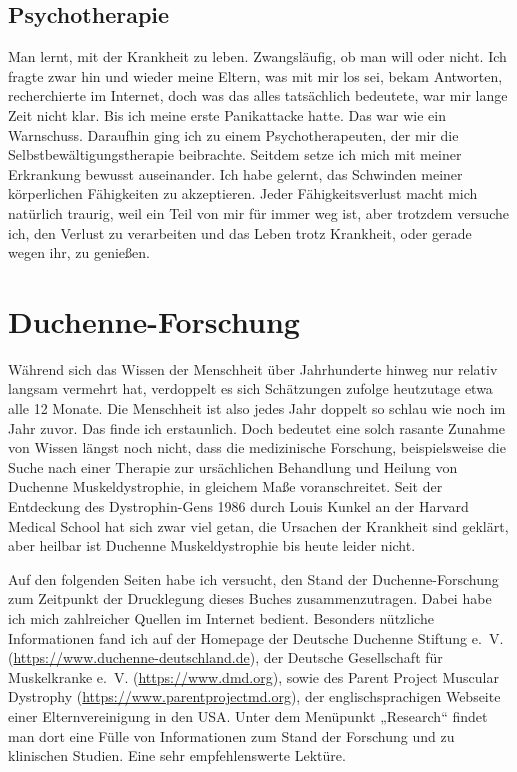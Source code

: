 \documentclass[fontsize=14pt,a4paper,headinclude,DIV=calc,automark]{scrbook}
\begin{document}
\subsection{Psychotherapie}

Man lernt, mit der Krankheit zu leben. Zwangsläufig, ob man will oder nicht. Ich fragte zwar hin und wieder meine Eltern, was mit mir los sei, bekam Antworten, recherchierte im Internet, doch was das alles tatsächlich bedeutete, war mir lange Zeit nicht klar. Bis ich meine erste Panikattacke hatte. Das war wie ein Warnschuss. Daraufhin ging ich zu einem Psychotherapeuten, der mir die Selbstbewältigungstherapie beibrachte. Seitdem setze ich mich mit meiner Erkrankung bewusst auseinander. Ich habe gelernt, das Schwinden meiner körperlichen Fähigkeiten zu akzeptieren. Jeder Fähigkeitsverlust macht mich natürlich traurig, weil ein Teil von mir für immer weg ist, aber trotzdem versuche ich, den Verlust zu verarbeiten und das Leben trotz Krankheit, oder gerade wegen ihr, zu genießen.

\section{Duchenne-Forschung}

Während sich das Wissen der Menschheit über Jahrhunderte hinweg nur relativ langsam vermehrt hat, verdoppelt es sich Schätzungen zufolge heutzutage etwa alle 12 Monate. Die Menschheit ist also jedes Jahr doppelt so schlau wie noch im Jahr zuvor. Das finde ich erstaunlich. Doch bedeutet eine solch rasante Zunahme von Wissen längst noch nicht, dass die medizinische Forschung, beispielsweise die Suche nach einer Therapie zur ursächlichen Behandlung und Heilung von Duchenne Muskeldystrophie, in gleichem Maße voranschreitet. Seit der Entdeckung des Dystrophin-Gens 1986 durch Louis Kunkel an der Harvard Medical School hat sich zwar viel getan, die Ursachen der Krankheit sind geklärt, aber heilbar ist Duchenne Muskeldystrophie bis heute leider nicht.

Auf den folgenden Seiten habe ich versucht, den Stand der Duchenne-Forschung zum Zeitpunkt der Drucklegung dieses Buches zusammenzutragen. Dabei habe ich mich zahlreicher Quellen im Internet bedient. Besonders nützliche Informationen fand ich auf der Homepage der Deutsche Duchenne Stiftung e.~V. (\url{https://www.duchenne-deutschland.de}), der Deutsche Gesellschaft für Muskelkranke e.~V. (\url{https://www.dmd.org}), sowie des Parent Project Muscular Dystrophy (\url{https://www.parentprojectmd.org}), der englischsprachigen Webseite einer Elternvereinigung in den USA. Unter dem Menüpunkt „Research“ findet man dort eine Fülle von Informationen zum Stand der Forschung und zu klinischen Studien. Eine sehr empfehlenswerte Lektüre.
\end{document}

